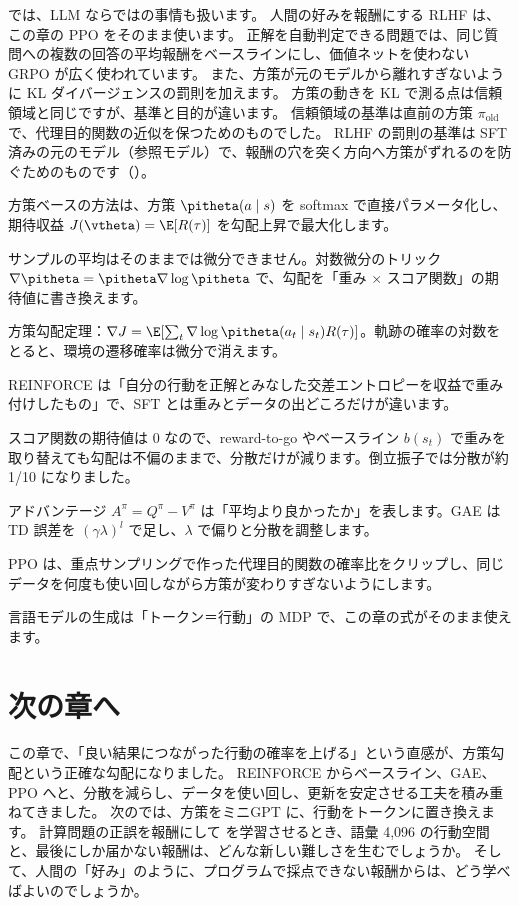 では、LLM ならではの事情も扱います。
人間の好みを報酬にする RLHF は、この章の PPO をそのまま使います\cite{ouyang2022training}。
正解を自動判定できる問題では、同じ質問への複数の回答の平均報酬をベースラインにし、価値ネットを使わない GRPO が広く使われています\cite{shao2024deepseekmath}。
また、方策が元のモデルから離れすぎないように KL ダイバージェンスの罰則を加えます。
方策の動きを KL で測る点は信頼領域と同じですが、基準と目的が違います。
信頼領域の基準は直前の方策 $\pi_{\text{old}}$ で、代理目的関数の近似を保つためのものでした。
RLHF の罰則の基準は SFT 済みの元のモデル（参照モデル）で、報酬の穴を突く方向へ方策がずれるのを防ぐためのものです（）。

\begin{summary}
\item 方策ベースの方法は、方策 $\pitheta(a\mid s)$ を softmax で直接パラメータ化し、期待収益 $J(\vtheta)=\E[R(\tau)]$ を勾配上昇で最大化します。
\item サンプルの平均はそのままでは微分できません。対数微分のトリック $\nabla\pitheta=\pitheta\nabla\log\pitheta$ で、勾配を「重み $\times$ スコア関数」の期待値に書き換えます。
\item 方策勾配定理：$\nabla J=\E[\sum_t\nabla\log\pitheta(a_t\mid s_t)R(\tau)]$。軌跡の確率の対数をとると、環境の遷移確率は微分で消えます。
\item REINFORCE は「自分の行動を正解とみなした交差エントロピーを収益で重み付けしたもの」で、SFT とは重みとデータの出どころだけが違います。
\item スコア関数の期待値は 0 なので、reward-to-go やベースライン $b(s_t)$ で重みを取り替えても勾配は不偏のままで、分散だけが減ります。倒立振子では分散が約 1/10 になりました。
\item アドバンテージ $A^\pi=Q^\pi-V^\pi$ は「平均より良かったか」を表します。GAE は TD 誤差を $(\gamma\lambda)^l$ で足し、$\lambda$ で偏りと分散を調整します。
\item PPO は、重点サンプリングで作った代理目的関数の確率比をクリップし、同じデータを何度も使い回しながら方策が変わりすぎないようにします。
\item 言語モデルの生成は「トークン＝行動」の MDP で、この章の式がそのまま使えます。
\end{summary}

\section*{次の章へ}

この章で、「良い結果につながった行動の確率を上げる」という直感が、方策勾配という正確な勾配になりました。
REINFORCE からベースライン、GAE、PPO へと、分散を減らし、データを使い回し、更新を安定させる工夫を積み重ねてきました。
次のでは、方策をミニGPT に、行動をトークンに置き換えます。
計算問題の正誤を報酬にして  を学習させるとき、語彙 4,096 の行動空間と、最後にしか届かない報酬は、どんな新しい難しさを生むでしょうか。
そして、人間の「好み」のように、プログラムで採点できない報酬からは、どう学べばよいのでしょうか。

